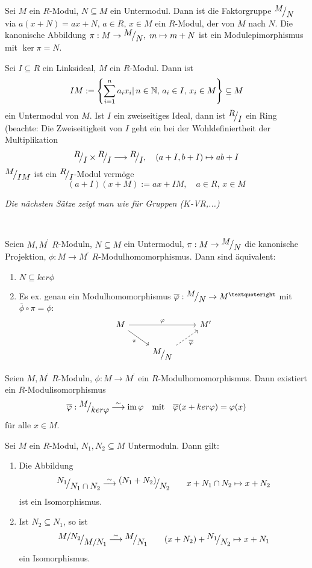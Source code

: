 \begin{bem+df}\label{bemdf1.9}
	Sei $M$ ein $R$-Modul, $N\subseteq M$ ein Untermodul. Dann ist die Faktorgruppe $\QR{M}{N}$ via $a(x+N) = ax+N, \, a\in R, \,x\in M$ ein $R$-Modul, der  von $M$ nach $N$. Die kanonische Abbildung $\pi:M \to \QR{M}{N}, \; m \mapsto m+N$ ist ein Modulepimorphismus mit $\ker \pi = N$.
\end{bem+df}
\begin{bsp}
	Sei $I\subseteq R$ ein Linksideal, $M$ ein $R$-Modul. Dann ist 
	$$IM:= \left\{\sum_{i=1}^n a_i x_i|\, n\in \mathbb{N}, \, a_i \in I, \, x_i \in M\right\}\subseteq M$$
	ein Untermodul von $M$. Ist $I$ ein zweiseitiges Ideal, dann ist $\QR{R}{I}$ ein Ring (beachte: Die Zweiseitigkeit von $I$ geht ein bei der Wohldefiniertheit der Multiplikation
	$$\QR{R}{I} \times \QR{R}{I} \longrightarrow \QR{R}{I}, \quad (a+I, b+I) \mapsto ab+I$$
	$\QR{M}{IM}$ ist ein $\QR{R}{I}$-Modul vermöge
	$$(a+I)(x+M) := ax+IM, \quad a\in R, \, x\in M$$ 
\end{bsp}
\begin{center}
	\emph{Die nächsten Sätze zeigt man wie für Gruppen ($K$-VR,...)}
\end{center}
\ 
\begin{sa}\label{sa1.11}
	Seien $M, M^{’} $ $R$-Moduln, $N \subseteq M $ ein Untermodul, $ \pi: M \to \QR{M}{N} $ die kanonische Projektion, $\phi: M \to M^{’} $ $R$-Modulhomomorphismus. Dann sind äquivalent: 
\begin{enumerate}[label= \roman*)]
	\item $N \subseteq ker\phi$
	\item Es ex. genau ein Modulhomomorphismus $\overline{\phi}: \QR{M}{N} \to M^{’} $ mit $\overline{\phi} \circ \pi = \phi:$
	$$\begin{tikzcd}
	M \arrow[swap]{dr}{\pi} \arrow{rr}{\phi} & & M'\\
	& \QR{M}{N} \arrow[swap,dashed]{ru}{\overline{\phi}}&
	\end{tikzcd}$$
	\end{enumerate}
\end{sa}
\begin{sa}[Homomorphiesatz] Seien $M, M^{’} $ $R$-Moduln,  $\phi: M \to M^{’} $ ein $R$-Modulhomomorphismus. Dann existiert ein $R$-Modulisomorphismus $$\overline{\phi}: \QR{M}{ker\phi} \overset{\sim}{\longrightarrow} \im\phi \quad \text{mit} \quad \overline{\phi}(x+ker\phi)=\phi(x)$$ für alle $ x \in M$.
\end{sa}
\begin{sa}[Isomorphiesaätze]\label{sa1.13}Sei $M$ ein $R$-Modul, $N_1, N_2 \subseteq M$ Untermoduln. Dann gilt:
	\begin{enumerate}[label=\alph*)]
		\item Die Abbildung$$\QR{N_1}{N_1 \cap N_2} \overset{\sim}{\longrightarrow} \QR{(N_1+N_2)}{N_2} \qquad x + N_1\cap N_2  \mapsto x +N_2$$ ist ein Isomorphismus.
		\item Ist $ N_2 \subseteq N_1$, so ist
		 $$\QR{M/N_2}{M/N_1} \overset{\sim}{\longrightarrow} \QR{M}{N_1}\qquad (x+N_2)+\QR{N_1}{N_2} \mapsto x+N_1$$
		 ein Isomorphismus.
	\end{enumerate}
\end{sa}
